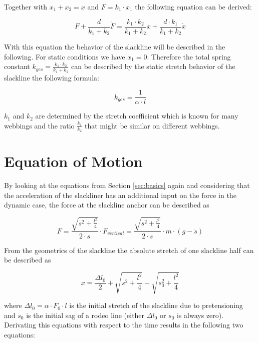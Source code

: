 Together with $x_1 + x_2 = x$ and $F = k_1 \cdot x_1$ the following equation can be derived:

\begin{equation}
	F + \frac{d}{k_1 + k_2} \dot F = \frac{k_1 \cdot k_2}{k_1 + k_2} x + \frac{d \cdot k_1}{k_1 + k_2} \dot x
	\label{eqn:linearSolidModel}
\end{equation}

With this equation the behavior of the slackline will be described in the following. For static conditions we have $\dot x_1 = 0$. Therefore the total spring constant $k_{ges} = \frac{k_1 \cdot k_2}{k_1 + k_2}$ can be described by the static stretch behavior of the slackline the following formula:

\begin{equation}
	k_{ges} = \frac{1}{\alpha \cdot l}
\end{equation}

$k_1$ and $k_2$ are determined by the stretch coefficient which is known for many webbings and the ratio $\frac{k_1}{k_2}$ that might be similar on different webbings.

\section{Equation of Motion}

By looking at the equations from Section \ref{sec:basics} again and considering that the acceleration of the slackliner has an additional input on the force in the dynamic case, the force at the slackline anchor can be described as

\begin{equation}
	F = \frac{\sqrt{s^2 + \frac{l^2}{4}}}{2 \cdot s} \cdot F_{vertical} = \frac{\sqrt{s^2 + \frac{l^2}{4}}}{2 \cdot s} \cdot m\cdot (g - \ddot s)
\end{equation}

From the geometrics of the slackline the absolute stretch of one slackline half can be described as

\begin{equation}
	x = \frac{\Delta l_0}{2} + \sqrt{s^2 + \frac{l^2}{4}} - \sqrt{s_0^2 + \frac{l^2}{4}}
\end{equation}

where $\Delta l_0 = \alpha \cdot F_0 \cdot l$ is the initial stretch of the slackline due to pretensioning and $s_0$ is the initial sag of a rodeo line (either $\Delta l_0$ or $s_0$ is always zero). Derivating this equations with respect to the time results in the following two equations:


